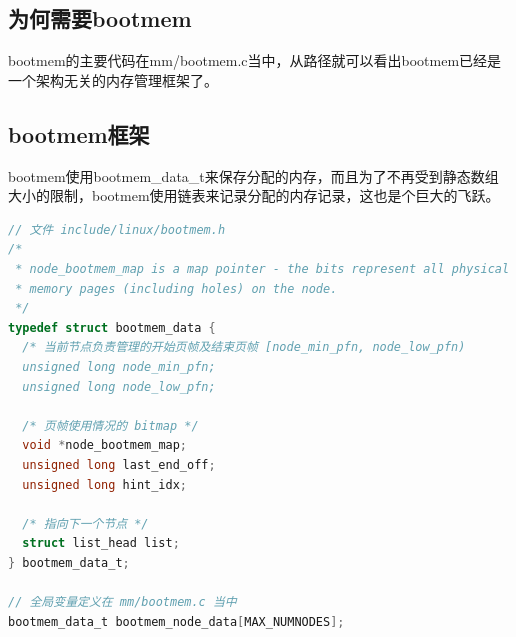 \documentclass[b5paper,9pt,twoside,openany]{article}
\begin{document}
\subsection{为何需要bootmem}
bootmem的主要代码在mm/bootmem.c当中，从路径就可以看出bootmem已经是一个架构无关的内存管理框架了。

\subsection{bootmem框架}
bootmem使用bootmem\_data\_t来保存分配的内存，而且为了不再受到静态数组大小的限制，bootmem使用链表来记录分配的内存记录，这也是个巨大的飞跃。
\begin{lstlisting}[language=C]
// 文件 include/linux/bootmem.h
/*
 * node_bootmem_map is a map pointer - the bits represent all physical
 * memory pages (including holes) on the node.
 */
typedef struct bootmem_data {
  /* 当前节点负责管理的开始页帧及结束页帧 [node_min_pfn, node_low_pfn)
  unsigned long node_min_pfn;
  unsigned long node_low_pfn;
  
  /* 页帧使用情况的 bitmap */
  void *node_bootmem_map;
  unsigned long last_end_off;
  unsigned long hint_idx;
 
  /* 指向下一个节点 */
  struct list_head list;
} bootmem_data_t;

// 全局变量定义在 mm/bootmem.c 当中
bootmem_data_t bootmem_node_data[MAX_NUMNODES];
\end{lstlisting}
\end{document}
